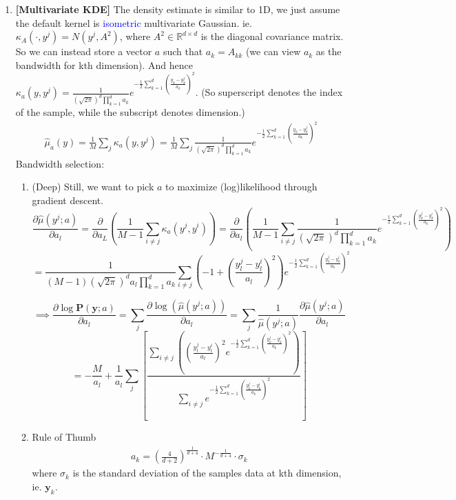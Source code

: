 \documentclass[11pt]{article}
\begin{document}
\begin{enumerate}
    \item {\bf [Multivariate KDE]}
    The density estimate is similar to 1D, we just assume the default kernel is \textcolor{blue}{isometric} multivariate Gaussian.
    ie. $\kappa_A(\cdot,{y}^j) = N({y}^j,A^2)$, where $A^2 \in \mathbb{R}^{d\times d}$ is the diagonal covariance matrix. So we can instead store a vector ${a}$ such that ${a}_k = A_{kk}$ (we can view $a_k$ as the bandwidth for kth dimension).
    And hence $\kappa_a(y,y^j) = \frac{1}{(\sqrt{2\pi})^d \prod_{k=1}^d a_k} e^{-\frac{1}{2}\sum_{k=1}^d (\frac{y_k-y^j_k}{a_k})^2}$. (So superscript denotes the index of the sample, while the subscript denotes dimension.)
    \begin{align*}
        \hat{\mu}_a(y) = \frac{1}{M} \sum_j \kappa_a(y,y^j)
        = \frac{1}{M} \sum_j \frac{1}{(\sqrt{2\pi})^d \prod_{k=1}^d a_k} e^{-\frac{1}{2}\sum_{k=1}^d (\frac{y_k-y^j_k}{a_k})^2}
    \end{align*}
    Bandwidth selection:
    \begin{enumerate}
        \item (Deep)
        Still, we want to pick $a$ to maximize (log)likelihood through gradient descent.
        $$
        \frac{\partial \hat{\mu}(y^j;a)}{\partial a_l}
        = \frac{\partial}{\partial a_L} \left(\frac{1}{M-1} \sum_{i\ne j} \kappa_a(y^j,y^i)\right)
        = \frac{\partial}{\partial a_l} \left(\frac{1}{M-1} \sum_{i\ne j} \frac{1}{(\sqrt{2\pi})^d \prod_{k=1}^d a_k} e^{-\frac{1}{2}\sum_{k=1}^d (\frac{y^j_k-y^i_k}{a_k})^2}\right)
        $$
        $$
        = \frac{1}{(M-1)(\sqrt{2\pi})^d a_l \prod_{k=1}^d a_k} \sum_{i\ne j}
        \left(-1 + (\frac{y^j_l-y^i_l}{a_l})^2\right) e^{-\frac{1}{2} \sum_{k=1}^d (\frac{y^j_k-y^i_k}{a_k})^2}
        $$
        
        $$
        \implies \frac{\partial \log \mathbf{P}(\mathbf{y}; a)}{\partial a_l}
        = \sum_j \frac{\partial \log \left(\hat{\mu}(y^j;a)\right)}{\partial a_l}
        = \sum_j \frac{1}{\hat{\mu}(y^j;a)} \frac{\partial \hat{\mu}(y^j;a)}{\partial a_l}
        $$
        $$
        = -\frac{M}{a_l} + \frac{1}{a_l} \sum_j \left[
        \frac{\sum_{i\ne j} \left(
        (\frac{y^j_l-y^i_l}{a_l})^2 e^{-\frac{1}{2} \sum_{k=1}^d (\frac{y^j_k-y^i_k}{a_k})^2}
        \right)}
        {\sum_{i\ne j} e^{-\frac{1}{2} \sum_{k=1}^d (\frac{y^j_k-y^i_k}{a_k})^2}}
        \right]
        $$
        
        \item Rule of Thumb
        \begin{align*}
            a_k = (\frac{4}{d+2})^{\frac{1}{d+4}}
            \cdot M^{-\frac{1}{d+4}} \cdot \sigma_k
        \end{align*}
        where $\sigma_k$ is the standard deviation of the samples data at kth dimension, ie. $\mathbf{y}_k$.
    \end{enumerate}
    

\end{enumerate}
\end{document}
